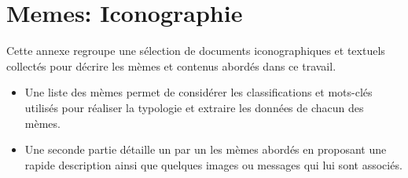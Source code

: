 \chapter[Memes: Iconographie]{Memes: Iconographie}
\label{sec:fullmemes}

Cette annexe regroupe une sélection de documents iconographiques et textuels collectés pour décrire les mèmes et contenus abordés dans ce travail. 

\begin{itemize}
    
\item Une liste des mèmes permet de considérer les classifications et mots-clés utilisés pour réaliser la typologie et extraire les données de chacun des mèmes. 
\item Une seconde partie détaille un par un les mèmes abordés en proposant une rapide description ainsi que quelques images ou messages qui lui sont associés.

\end{itemize}

